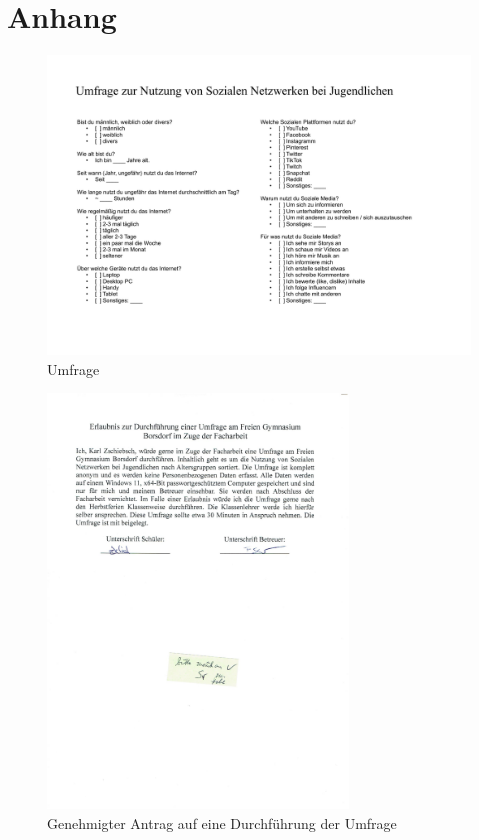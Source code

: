 \section{Anhang}

\begin{figure}[h!]
    \centering
    \includegraphics[angle=90, scale=0.7]{image/Umfrage.pdf}
    \caption{\label{imgs:umfrage}Umfrage}
\end{figure}

\begin{figure}[ht]
    \centering
    \includegraphics[width=8cm]{image/Genehmigung.jpg}
    \caption{\label{imgs:genehmigung}Genehmigter Antrag auf eine Durchführung der Umfrage}
\end{figure}

